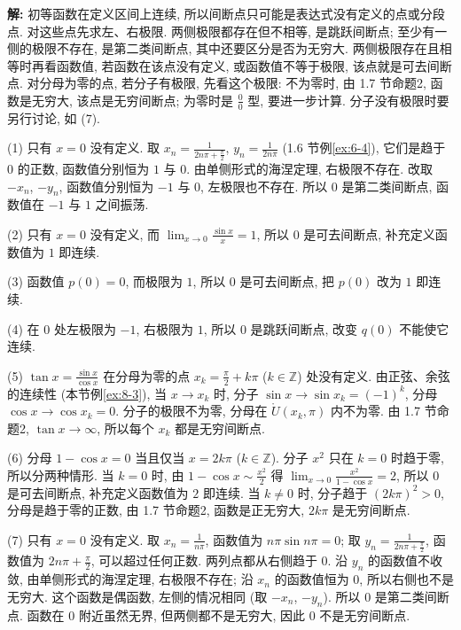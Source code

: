 \documentclass[UTF8,openany]{ctexbook}
\theoremstyle{chinesetextbook}
\newenvironment{cnsolution}{\par\indent\textbf{解:} \ignorespaces}{\par}
\begin{document}
\begin{cnsolution}
初等函数在定义区间上连续, 所以间断点只可能是表达式没有定义的点或分段点. 对这些点先求左、右极限. 两侧极限都存在但不相等, 是跳跃间断点; 至少有一侧的极限不存在, 是第二类间断点, 其中还要区分是否为无穷大. 两侧极限存在且相等时再看函数值, 若函数在该点没有定义, 或函数值不等于极限, 该点就是可去间断点. 对分母为零的点, 若分子有极限, 先看这个极限: 不为零时, 由 1.7 节命题2, 函数是无穷大, 该点是无穷间断点; 为零时是 $\displaystyle\frac00$ 型, 要进一步计算. 分子没有极限时要另行讨论, 如 (7).

(1) 只有 $x=0$ 没有定义. 取 $\displaystyle x_n=\frac1{2n\pi+\frac\pi2}$, $\displaystyle y_n=\frac1{2n\pi}$ (1.6 节例\ref{ex:6-4}), 它们是趋于 $0$ 的正数, 函数值分别恒为 $1$ 与 $0$. 由单侧形式的海涅定理, 右极限不存在. 改取 $-x_n$, $-y_n$, 函数值分别恒为 $-1$ 与 $0$, 左极限也不存在. 所以 $0$ 是第二类间断点, 函数值在 $-1$ 与 $1$ 之间振荡.

(2) 只有 $x=0$ 没有定义, 而 $\displaystyle\lim_{x\to0}\frac{\sin x}x=1$, 所以 $0$ 是可去间断点, 补充定义函数值为 $1$ 即连续.

(3) 函数值 $p(0)=0$, 而极限为 $1$, 所以 $0$ 是可去间断点, 把 $p(0)$ 改为 $1$ 即连续.

(4) 在 $0$ 处左极限为 $-1$, 右极限为 $1$, 所以 $0$ 是跳跃间断点, 改变 $q(0)$ 不能使它连续.

(5) $\displaystyle\tan x=\frac{\sin x}{\cos x}$ 在分母为零的点 $\displaystyle x_k=\frac\pi2+k\pi$ ($k\in\mathbb Z$) 处没有定义. 由正弦、余弦的连续性 (本节例\ref{ex:8-3}), 当 $x\to x_k$ 时, 分子 $\sin x\to\sin x_k=(-1)^k$, 分母 $\cos x\to\cos x_k=0$. 分子的极限不为零, 分母在 $\mathring U(x_k,\pi)$ 内不为零. 由 1.7 节命题2, $\tan x\to\infty$, 所以每个 $x_k$ 都是无穷间断点.

(6) 分母 $1-\cos x=0$ 当且仅当 $x=2k\pi$ ($k\in\mathbb Z$). 分子 $x^2$ 只在 $k=0$ 时趋于零, 所以分两种情形. 当 $k=0$ 时, 由 $\displaystyle1-\cos x\sim\frac{x^2}2$ 得 $\displaystyle\lim_{x\to0}\frac{x^2}{1-\cos x}=2$, 所以 $0$ 是可去间断点, 补充定义函数值为 $2$ 即连续. 当 $k\ne0$ 时, 分子趋于 $(2k\pi)^2>0$, 分母是趋于零的正数, 由 1.7 节命题2, 函数是正无穷大, $2k\pi$ 是无穷间断点.

(7) 只有 $x=0$ 没有定义. 取 $\displaystyle x_n=\frac1{n\pi}$, 函数值为 $n\pi\sin n\pi=0$; 取 $\displaystyle y_n=\frac1{2n\pi+\frac\pi2}$, 函数值为 $\displaystyle2n\pi+\frac\pi2$, 可以超过任何正数. 两列点都从右侧趋于 $0$. 沿 $y_n$ 的函数值不收敛, 由单侧形式的海涅定理, 右极限不存在; 沿 $x_n$ 的函数值恒为 $0$, 所以右侧也不是无穷大. 这个函数是偶函数, 左侧的情况相同 (取 $-x_n$, $-y_n$). 所以 $0$ 是第二类间断点. 函数在 $0$ 附近虽然无界, 但两侧都不是无穷大, 因此 $0$ 不是无穷间断点.
\end{cnsolution}
\end{document}
